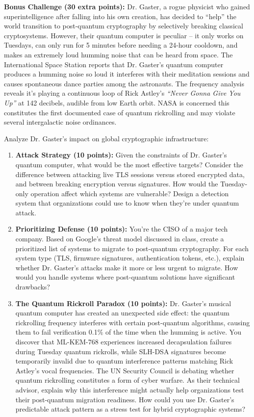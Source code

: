 \documentclass[10pt,a4paper,american]{article}
\begin{document}
\begin{tcolorbox}[colframe=EarthBrown!30!white,colback=EarthBrown!5!white]
	\textbf{Bonus Challenge (30 extra points):} Dr. Gaster, a rogue physicist who gained superintelligence after falling into his own creation, has decided to ``help'' the world transition to post-quantum cryptography by selectively breaking classical cryptosystems. However, their quantum computer is peculiar -- it only works on Tuesdays, can only run for 5 minutes before needing a 24-hour cooldown, and makes an extremely loud humming noise that can be heard from space. The International Space Station reports that Dr. Gaster's quantum computer produces a humming noise so loud it interferes with their meditation sessions and causes spontaneous dance parties among the astronauts. The frequency analysis reveals it's playing a continuous loop of Rick Astley's \textit{``Never Gonna Give You Up''} at 142 decibels, audible from low Earth orbit. NASA is concerned this constitutes the first documented case of quantum rickrolling and may violate several intergalactic noise ordinances.

	Analyze Dr. Gaster's impact on global cryptographic infrastructure:
	\begin{enumerate}
		\item \textbf{Attack Strategy (10 points):} Given the constraints of Dr. Gaster's quantum computer, what would be the most effective targets? Consider the difference between attacking live TLS sessions versus stored encrypted data, and between breaking encryption versus signatures. How would the Tuesday-only operation affect which systems are vulnerable? Design a detection system that organizations could use to know when they're under quantum attack.

		\item \textbf{Prioritizing Defense (10 points):} You're the CISO of a major tech company. Based on Google's threat model discussed in class, create a prioritized list of systems to migrate to post-quantum cryptography. For each system type (TLS, firmware signatures, authentication tokens, etc.), explain whether Dr. Gaster's attacks make it more or less urgent to migrate. How would you handle systems where post-quantum solutions have significant drawbacks?

		\item \textbf{The Quantum Rickroll Paradox (10 points):} Dr. Gaster's musical quantum computer has created an unexpected side effect: the quantum rickrolling frequency interferes with certain post-quantum algorithms, causing them to fail verification 0.1\% of the time when the humming is active. You discover that ML-KEM-768 experiences increased decapsulation failures during Tuesday quantum rickrolls, while SLH-DSA signatures become temporarily invalid due to quantum interference patterns matching Rick Astley's vocal frequencies. The UN Security Council is debating whether quantum rickrolling constitutes a form of cyber warfare. As their technical advisor, explain why this interference might actually help organizations test their post-quantum migration readiness. How could you use Dr. Gaster's predictable attack pattern as a stress test for hybrid cryptographic systems?
	\end{enumerate}
\end{tcolorbox}
\end{document}
